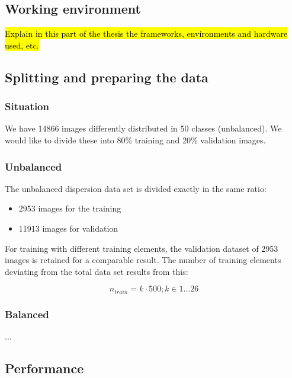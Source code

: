 \documentclass[10pt]{article}
\begin{document}
		\subsection{Working environment}
	
			\hl{Explain in this part of the thesis the frameworks, environments and hardware used, etc.}
			
		\subsection{Splitting and preparing the data}
		
			\subsubsection{Situation}
			
				We have 14866 images differently distributed in 50 classes (unbalanced). We would like to divide these into 80\% training and 20\% validation images.
				
			\subsubsection{Unbalanced}
			
				The unbalanced dispersion data set is divided exactly in the same ratio:
				
				\begin{itemize}
					\item 2953 images for the training
					\item 11913 images for validation
				\end{itemize}
				
				For training with different training elements, the validation dataset of 2953 images is retained for a comparable result. The number of training elements deviating from the total data set results from this:
				
				\begin{equation}
					n_{train} = k \cdot 500;  k \in 1 \dots 26
				\end{equation}
			
			\subsubsection{Balanced}
		
				\noindent ...
	
		\subsection{Performance}
		
\end{document}
